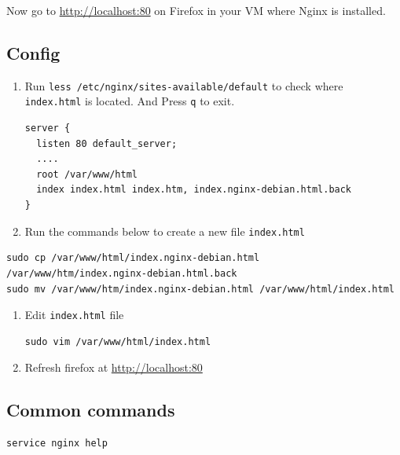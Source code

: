 \documentclass[11pt]{article}
\begin{document}
Now go to \url{http://localhost:80} on Firefox in your VM where Nginx is installed.

\subsection{Config}
\label{sec:org444f7d6}

\begin{enumerate}
\item Run \texttt{less /etc/nginx/sites-available/default} to check where \texttt{index.html} is located.
And Press \texttt{q} to exit.
\begin{verbatim}
server {
  listen 80 default_server;
  ....
  root /var/www/html
  index index.html index.htm, index.nginx-debian.html.back
}
\end{verbatim}

\item Run the commands below to create a new file \texttt{index.html}
\end{enumerate}

\begin{verbatim}
sudo cp /var/www/html/index.nginx-debian.html /var/www/htm/index.nginx-debian.html.back
sudo mv /var/www/htm/index.nginx-debian.html /var/www/html/index.html
\end{verbatim}

\begin{enumerate}
\item Edit \texttt{index.html} file

\begin{verbatim}
sudo vim /var/www/html/index.html
\end{verbatim}

\item Refresh firefox at \url{http://localhost:80}
\end{enumerate}

\subsection{Common commands}
\label{sec:org285490f}

\begin{verbatim}
service nginx help
\end{verbatim}
\end{document}
